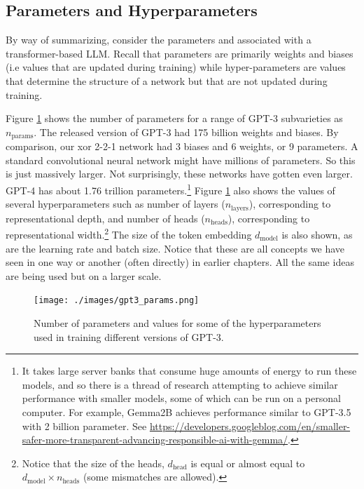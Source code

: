 \subsection{Parameters and Hyperparameters}

By way of summarizing, consider the parameters and  
associated with a transformer-based LLM. Recall that parameters are primarily
weights and biases (i.e values that are updated during training) while
hyper-parameters are values that determine the structure of a network but that
are not updated during training.

Figure \ref{gptParams} shows the  number of parameters for a range of GPT-3
subvarieties as $n_\text{params}$. The released version of GPT-3 had 175
billion weights and biases. By comparison, our xor 2-2-1 network had 3 biases
and 6 weights, or 9 parameters. A standard convolutional neural network might
have millions of parameters. So this is just massively larger. Not
surprisingly, these networks have gotten even larger. GPT-4 has about 1.76
trillion parameters.\footnote{It takes large server banks that  consume huge
amounts of energy to run these models, and so there is a thread of research
attempting to achieve similar performance with smaller models, some of which
can be run on a  personal computer. For example, Gemma2B achieves performance
similar to GPT-3.5 with 2 billion parameter. See
\url{https://developers.googleblog.com/en/smaller-safer-more-transparent-advancing-responsible-ai-with-gemma/}.}
Figure \ref{gptParams} also shows the values of several hyperparameters such as
number of layers ($n_\text{layers}$), corresponding to representational depth,
and number of heads ($n_\text{heads}$), corresponding to representational
width.\footnote{Notice that the size of the heads, $d_\text{head}$ is equal or
almost equal to  $d_\text{model} \times n_\text{heads}$ (some mismatches are
allowed).} The size of the token embedding  $d_\text{model}$ is also shown, as
are the learning rate and batch size. Notice that these are all concepts we
have seen in one way or another (often directly) in earlier chapters. All the
same ideas are being used but on a larger scale.

\begin{figure}[ht]
\centering
\texttt{[image: ./images/gpt3\_params.png]}
\caption[\url{https://arxiv.org/abs/2005.14165}.]{Number of parameters and
values for some of the hyperparameters used in training different versions of
GPT-3.
}
\label{gptParams}
\end{figure}

